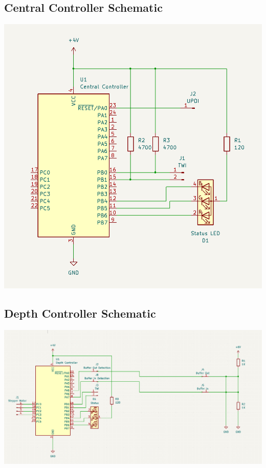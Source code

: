 \documentclass[11pt,a4paper,titlepage]{report}
\begin{document}
	\subsection{Central Controller Schematic}\label{appendix:central_controller_schematic}
	\begin{center}
		\label{picture:central_controller_schematic}
		\includegraphics[width=\linewidth]{assets/CentralControllerSchematic.png}
	\end{center}
	\subsection{Depth Controller Schematic}\label{appendix:depth_controller_schematic}
	\begin{center}
		\label{picture:depth_controller_schematic}
		\includegraphics[width=\linewidth]{assets/DepthControllerSchematic.png}
	\end{center}
\end{document}
